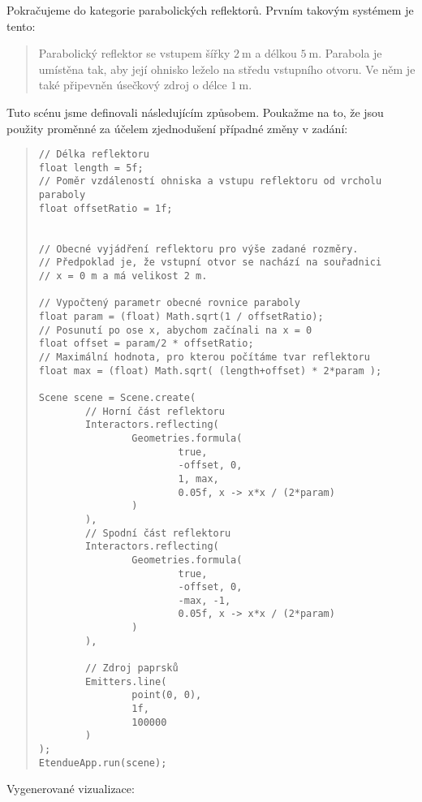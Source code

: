 Pokračujeme do kategorie parabolických reflektorů. Prvním takovým systémem je tento:

\begin{quote}
    Parabolický reflektor se vstupem šířky $2\ \mathrm{m}$ a délkou $5\ \mathrm{m}$. Parabola je umístěna tak, aby její ohnisko leželo na středu vstupního otvoru. Ve něm je také připevněn úsečkový zdroj o délce $1\ \mathrm{m}$.
\end{quote}

Tuto scénu jsme definovali následujícím způsobem. Poukažme na to, že jsou použity proměnné za účelem zjednodušení případné změny v zadání:

\begin{minipage}{\textwidth}\begin{quote}\begin{lstlisting}
// Délka reflektoru
float length = 5f;
// Poměr vzdáleností ohniska a vstupu reflektoru od vrcholu paraboly
float offsetRatio = 1f;


// Obecné vyjádření reflektoru pro výše zadané rozměry.
// Předpoklad je, že vstupní otvor se nachází na souřadnici
// x = 0 m a má velikost 2 m.

// Vypočtený parametr obecné rovnice paraboly
float param = (float) Math.sqrt(1 / offsetRatio);
// Posunutí po ose x, abychom začínali na x = 0
float offset = param/2 * offsetRatio;
// Maximální hodnota, pro kterou počítáme tvar reflektoru
float max = (float) Math.sqrt( (length+offset) * 2*param );

Scene scene = Scene.create(
        // Horní část reflektoru
        Interactors.reflecting(
                Geometries.formula(
                        true,
                        -offset, 0,
                        1, max,
                        0.05f, x -> x*x / (2*param)
                )
        ),
        // Spodní část reflektoru
        Interactors.reflecting(
                Geometries.formula(
                        true,
                        -offset, 0,
                        -max, -1,
                        0.05f, x -> x*x / (2*param)
                )
        ),

        // Zdroj paprsků
        Emitters.line(
                point(0, 0),
                1f,
                100000
        )
);
EtendueApp.run(scene);
\end{lstlisting}\end{quote}\end{minipage}

Vygenerované vizualizace:

